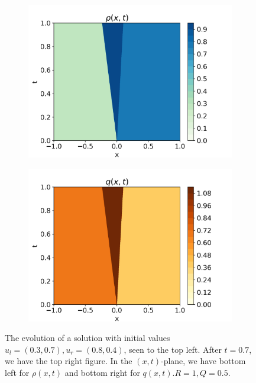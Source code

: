 \documentclass[10pt]{article}
\numberwithin{equation}{section}
\begin{document}
\begin{figure}[H]
\begin{subfigure}[b]{0.35\textwidth}
         \includegraphics[width=\textwidth]{Figures/Model/SysShockRho.png}
     \end{subfigure}
     \begin{subfigure}[b]{0.35\textwidth}
         \centering
         \includegraphics[width=\textwidth]{Figures/Model/SysShockQ.png}
     \end{subfigure}
        \caption{The evolution of a solution with initial values $u_l = (0.3, 0.7), u_r = (0.8, 0.4)$, seen to the top left. After $t = 0.7$, we have the top right figure. In the $(x,t)$-plane, we have bottom left for $\rho(x,t)$ and bottom right for $q(x,t)$.$R = 1, Q = 0.5$.}
        \label{fig:ExampleSysShock}
\end{figure}
\end{document}
